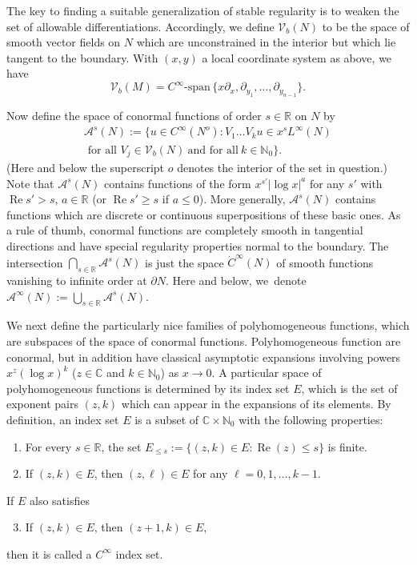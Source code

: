 \documentclass[JEP,XML,SOM,Unicode,NoFloatCountersInSection, NoEqCountersInSection,published]{cedram}
\newenvironment{enumeratea}
{\bgroup\def\theenumi{\alph{enumi}}\begin{enumerate}}
{\end{enumerate}\egroup}
\DeclareMathOperator{\Real}{Re}
\theoremstyle{plain}
\theoremstyle{definition}
\theoremstyle{remark}
\def\Rm{{\mathbb{R}}}
\def\Cm{{\mathbb{C}}}
\def\Nm{{\mathbb{N}}}
\def\A{\mathcal{A}}
\newcommand{\del}{\partial}
\begin{document}
The key to finding a suitable generalization of stable regularity is to weaken the set of allowable differentiations. Accordingly, we define $\mathcal V_b(N)$ to be the space of smooth vector fields on $N$ which are unconstrained in the interior but which lie tangent to the boundary. With $(x, y)$ a local coordinate system as above, we have\vspace*{-3pt}
\begin{equation}
\mathcal V_b(M) = C^\infty\text{-}\mathrm{span}\, \{ x\del_x, \del_{y_1}, \ldots, \del_{y_{n-1}} \}.
\label{Vb}
\end{equation}

Now define the space of conormal functions of order $s \in \mathbb R$ on $N$ by\vspace*{-5pt}
\begin{multline*}
\A^s (N) := \{u\in C^\infty(N^{o}): V_1 \ldots V_k u \in x^s L^\infty(N) \\
\text{ for all } V_j \in \mathcal V_b(N)\ \mbox{and for all}\ k \in \mathbb N_0\}.
\end{multline*}
(Here and below the superscript $o$ denotes the interior of the set in question.) Note that $\A^s(N)$ contains functions of the form $x^{s'}|{\log x}|^a$ for any $s'$ with $\Real s' > s$, $a \in \mathbb R$ (or $\Real s' \geq s$ if $a \leq 0$). More generally, $\A^s(N)$ contains functions which are discrete or continuous superpositions of these basic ones. As a rule of thumb, conormal functions are completely smooth in tangential directions and have special regularity properties normal to the boundary. The intersection $\bigcap_{s\in \Rm} \A^s (N)$ is just the space $\dot{C}^\infty (N)$ of smooth functions vanishing to infinite order at $\partial N$. Here and below, we~denote $\A^\infty(N) := \bigcup_{s\in \Rm} \A^s(N)$.

We next define the particularly nice families of polyhomogeneous functions, which are subspaces of the space of conormal functions.
Polyhomogeneous function are conormal, but in addition have classical asymptotic expansions involving
powers $x^z (\log x)^k$ ($z \in \mathbb C$ and $k \in \mathbb N_0$) as $x \to 0$. A particular space of polyhomogeneous
functions is determined by its index set $E$, which is the set of exponent pairs $(z,k)$ which
can appear in the expansions of its elements. By definition, an index set $E$ is a subset of $\Cm\times \Nm_0$ with the following properties:

\begin{enumeratea}
\item\label{cond:a}
For every $s\in \Rm$, the set $E_{\le s} := \{(z,k)\in E : \Real (z)\le s\}$ is finite.
\item\label{cond:b}
If $(z,k)\in E$, then $(z,\ell)\in E$ for any $\ell = 0,1,\dots,k-1$.
\end{enumeratea}
\noindent
If $E$ also satisfies
\begin{enumeratea}\setcounter{enumi}{2}
\item\label{cond:c}
If $(z,k)\in E$, then $(z+1,k)\in E$,
\end{enumeratea}
\noindent
then it is called a $C^\infty$ index set.
\end{document}
